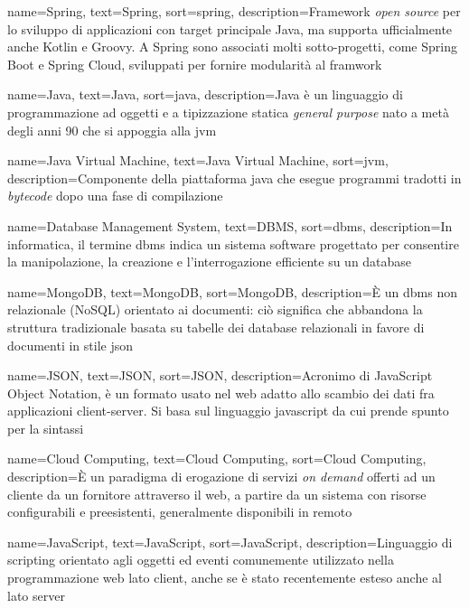 {
    name=Spring,
    text=Spring,
    sort=spring,
    description={Framework \textit{open source} per lo sviluppo di applicazioni con target principale Java, ma supporta ufficialmente anche Kotlin e Groovy. A Spring sono associati molti sotto-progetti, come Spring Boot e Spring Cloud, sviluppati per fornire modularità al framwork}
}

{
    name=Java,
    text=Java,
    sort=java,
    description={Java è un linguaggio di programmazione ad oggetti e a tipizzazione statica \emph{general purpose} nato a metà degli anni 90 che si appoggia alla \gls{jvm}}
}

{
    name=Java Virtual Machine,
    text=Java Virtual Machine,
    sort=jvm,
    description={Componente della piattaforma \gls{java} che esegue programmi tradotti in \emph{bytecode} dopo una fase di compilazione}
}

{
    name=Database Management System,
    text=DBMS,
    sort=dbms,
    description={In informatica, il termine \gls{dbms} indica un sistema software progettato per consentire la manipolazione, la creazione e l'interrogazione efficiente su un database}
}

{
    name=MongoDB,
    text=MongoDB,
    sort=MongoDB,
    description={È un \gls{dbms} non relazionale (NoSQL) orientato ai documenti: ciò significa che abbandona la struttura tradizionale basata su tabelle dei database relazionali in favore di documenti in stile \gls{json}}
}

{
    name=JSON,
    text=JSON,
    sort=JSON,
    description={Acronimo di JavaScript Object Notation, è un formato usato nel web adatto allo scambio dei dati fra applicazioni client-server. Si basa sul linguaggio \gls{javascript} da cui prende spunto per la sintassi}
}

{
    name=Cloud Computing,
    text=Cloud Computing,
    sort=Cloud Computing,
    description={È un paradigma di erogazione di servizi \emph{on demand} offerti ad un cliente da un fornitore attraverso il web, a partire da
    un sistema con risorse configurabili e preesistenti, generalmente disponibili in remoto}
}

{
    name=JavaScript,
    text=JavaScript,
    sort=JavaScript,
    description={Linguaggio di scripting orientato agli oggetti ed eventi comunemente utilizzato nella programmazione web lato client, anche se è stato recentemente esteso anche al lato server}
}

